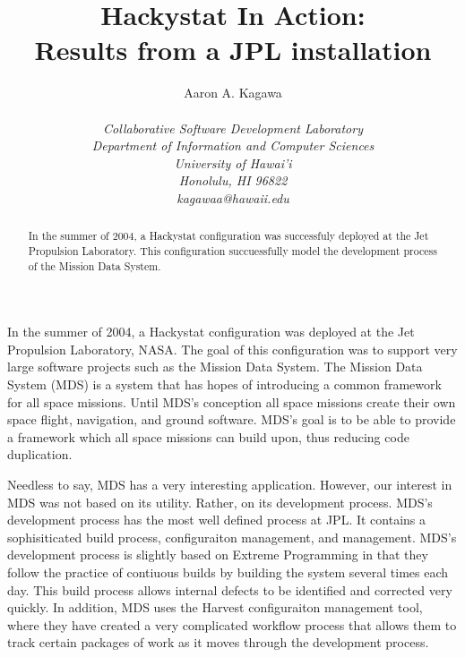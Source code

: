 \documentclass[11pt,twocolumn]{article}
\begin{document}
\title{Hackystat In Action: \\ Results from a JPL installation}
\author{\protect\begin{tabular}{ccc}
Aaron A. Kagawa \\
\end{tabular}\\
\em  Collaborative Software Development Laboratory \\
\em  Department of Information and Computer Sciences \\
\em  University of Hawai'i \\
\em  Honolulu, HI 96822 \\
\em  kagawaa@hawaii.edu}
\maketitle
\thispagestyle{empty}

\begin{abstract}  %
In the summer of 2004, a Hackystat configuration was successfuly deployed at the 
Jet Propulsion Laboratory. This configuration succuessfully model the development
process of the Mission Data System. 

\end{abstract}

\label{sec:intro}
In the summer of 2004, a Hackystat configuration was deployed at the Jet Propulsion 
Laboratory, NASA. The goal of this configuration was to support very large software
projects such as the Mission Data System. The Mission Data System (MDS) is a system
that has hopes of introducing a common framework for all space missions. Until MDS's
conception all space missions create their own space flight, navigation, and ground
software. MDS's goal is to be able to provide a framework which all space missions
can build upon, thus reducing code duplication.

Needless to say, MDS has a very interesting application. However, our interest in
MDS was not based on its utility. Rather, on its development process. MDS's development
process has the most well defined process at JPL. It contains a sophisiticated build
process, configuraiton management, and management. MDS's development process is slightly 
based on Extreme Programming in that they follow the practice of contiuous builds by
building the system several times each day. This build process allows internal defects
to be identified and corrected very quickly. In addition, MDS uses the Harvest configuraiton
management tool, where they have created a very complicated workflow process that allows
them to track certain packages of work as it moves through the development process.
\end{document}
